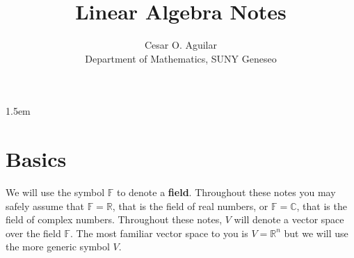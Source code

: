 \documentclass[12pt]{article}
\newcommand{\real}{\mathbb{R}}
\theoremstyle{definition}
\begin{document}
\title{Linear Algebra Notes}
\author{Cesar O. Aguilar \\ Department of Mathematics, SUNY Geneseo}

\maketitle


\tableofcontents
\baselineskip 1.5em


\section{Basics}
We will use the symbol $\mathbb{F}$ to denote a \textbf{field}.  Throughout these notes you may safely assume that $\mathbb{F}=\real$, that is the field of real numbers, or $\mathbb{F}=\mathbb{C}$, that is the field of complex numbers.  Throughout these notes, $V$ will denote a vector space over the field $\mathbb{F}$.  The most familiar vector space to you is $V=\real^n$ but we will use the more generic symbol $V$.
\end{document}
